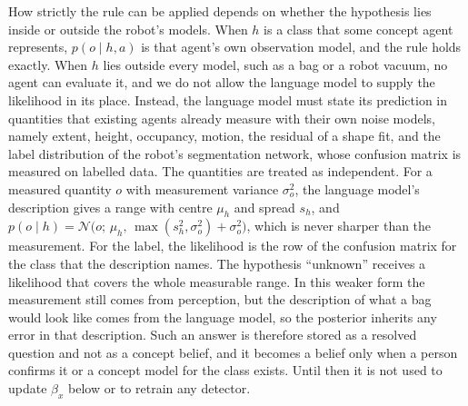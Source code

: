 How strictly the rule can be applied depends on whether the hypothesis lies inside or outside the robot's models.
When $h$ is a class that some concept agent represents, $p(o \mid h, a)$ is that agent's own observation model, and
the rule holds exactly. When $h$ lies outside every model, such as a bag or a robot vacuum, no agent can evaluate it,
and we do not allow the language model to supply the likelihood in its place. Instead, the language model must
state its prediction in quantities that existing agents already measure with their own noise models, namely extent,
height, occupancy, motion, the residual of a shape fit, and the label distribution of the robot's segmentation
network, whose confusion matrix is measured on labelled data. The quantities are treated as independent. For a
measured quantity $o$ with measurement variance $\sigma_o^2$, the language model's description gives a range with
centre $\mu_h$ and spread $s_h$, and $p(o \mid h) = \mathcal{N}\big(o;\, \mu_h,\, \max(s_h^2, \sigma_o^2) +
\sigma_o^2\big)$, which is never sharper than the measurement. For the label, the likelihood is the row of the
confusion matrix for the class that the description names. The hypothesis ``unknown'' receives a likelihood that covers the whole measurable range. In this
weaker form the measurement still comes from perception, but the description of what a bag would look like comes
from the language model, so the posterior inherits any error in that description. Such an answer is therefore
stored as a resolved question and not as a concept belief, and it becomes a belief only when a person confirms it
or a concept model for the class exists. Until then it is not used to update $\beta_x$ below or to retrain any
detector.


